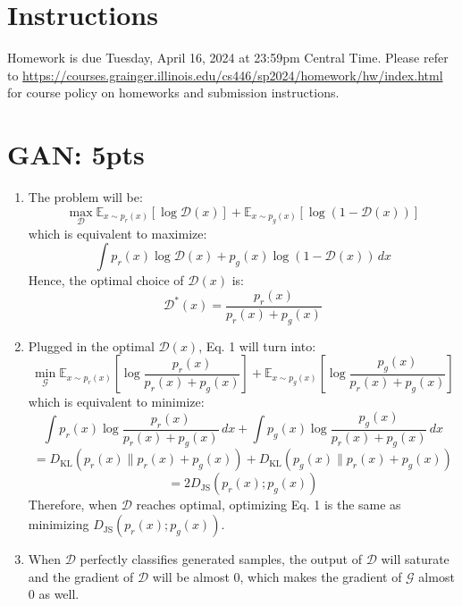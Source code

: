 \documentclass[12pt]{article}
\begin{document}
\singlespacing

\renewcommand{\familydefault}{\rmdefault}


\section{Instructions}

Homework is due Tuesday, April 16, 2024 at 23:59pm Central Time.
Please refer to \url{https://courses.grainger.illinois.edu/cs446/sp2024/homework/hw/index.html} for course policy on homeworks and submission instructions.

\section{GAN: 5pts}
\begin{enumerate}
    \item The problem will be:
    \[\max_{\mathcal{D}}\mathbb{E}_{x \sim p_r(x)}[\log\mathcal{D}(x)] + \mathbb{E}_{x \sim p_g(x)}[\log(1-\mathcal{D}(x))] \]
    which is equivalent to maximize:
    \[\int p_r(x)\log\mathcal{D}(x)+ p_g(x)\log(1-\mathcal{D}(x))\,dx\]
    Hence, the optimal choice of $\mathcal{D}(x)$ is:
    \[\mathcal{D}^*(x) = \frac{p_r(x)}{p_r(x) + p_g(x)}\]

    \item Plugged in the optimal $\mathcal{D}(x)$, Eq. 1 will turn into:
    \[\min_{\mathcal{G}}\mathbb{E}_{x \sim p_r(x)}\left[\log\frac{p_r(x)}{p_r(x) + p_g(x)}\right] + \mathbb{E}_{x \sim p_g(x)}\left[\log\frac{p_g(x)}{p_r(x) + p_g(x)}\right]\]
    which is equivalent to minimize:
    \[\int p_r(x)\log\frac{p_r(x)}{p_r(x) + p_g(x)}\,dx + \int p_g(x)\log\frac{p_g(x)}{p_r(x) + p_g(x)}\,dx\]
    \[= D_{\text{KL}}(p_r(x)\|p_r(x)+p_g(x)) + D_{\text{KL}}(p_g(x)\|p_r(x)+p_g(x))\]
    \[= 2D_{\text{JS}}(p_r(x);p_g(x))\]
    Therefore, when $\mathcal{D}$ reaches optimal, optimizing Eq. 1 is the same as minimizing $D_{\text{JS}}(p_r(x);p_g(x))$.

    \item When $\mathcal{D}$ perfectly classifies generated samples, the output of $\mathcal{D}$ will saturate and the gradient of $\mathcal{D}$ will be almost 0, which makes the gradient of $\mathcal{G}$ almost 0 as well.
\end{enumerate}
\newpage
\end{document}

